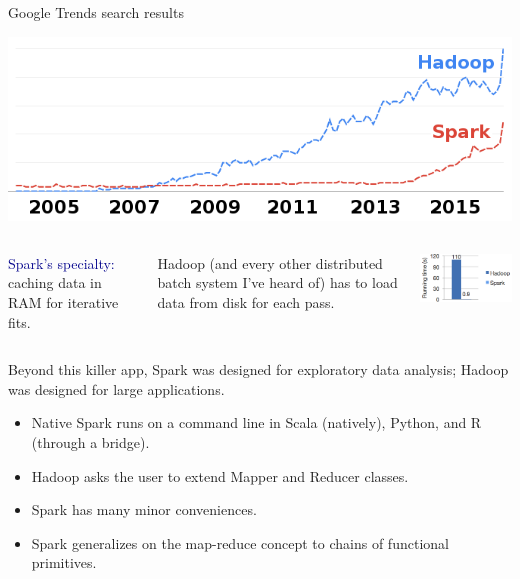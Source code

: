 \documentclass{beamer}
\begin{document}
\begin{frame}{Google Trends search results}
\begin{center}
\includegraphics[width=0.9\linewidth]{trends.png}
\end{center}
\end{frame}

\begin{frame}{}
\begin{columns}
\textcolor{darkblue}{Spark's specialty:} caching data in RAM for iterative fits.

\vspace{0.2 cm}
Hadoop (and every other distributed batch system I've heard of) has to load data from disk for each pass.

\includegraphics[width=\linewidth]{spark_time.png}
\end{columns}

\vfill
Beyond this killer app, Spark was designed for exploratory data analysis; Hadoop was designed for large applications.
\begin{itemize}
\item Native Spark runs on a command line in Scala (natively), Python, and R (through a bridge).
\item Hadoop asks the user to extend Mapper and Reducer classes.
\item Spark has many minor conveniences.
\item Spark generalizes on the map-reduce concept to chains of functional primitives.
\end{itemize}
\end{frame}
\end{document}
